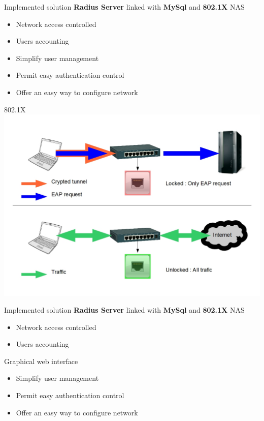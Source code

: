 \documentclass[12pt]{beamer}
\begin{document}
\begin{frame}{Implemented solution}
    \textbf{Radius Server} linked with \textbf{MySql} and \textbf{802.1X} NAS
    \begin{itemize}
	\item<1-2> Network access controlled
	\item<2> Users accounting
    \end{itemize}
    \vfill
    \begin{itemize}
	\item<0> Simplify user management
	\item<0> Permit easy authentication control
	\item<0> Offer an easy way to configure network
    \end{itemize}
    \vfill
\end{frame}
	
\begin{frame}{802.1X}
    \includegraphics[width=300pts]{img/dot1x.jpg}
\end{frame}

\begin{frame}{Implemented solution}
    \textbf{Radius Server} linked with \textbf{MySql} and \textbf{802.1X} NAS
    \begin{itemize}
	\item Network access controlled
	\item Users accounting
    \end{itemize}
    \vfill
    Graphical web interface
    \begin{itemize}
	\item<1-> Simplify user management
	\item<2-> Permit easy authentication control
	\item<3-> Offer an easy way to configure network
    \end{itemize}
    \vfill
\end{frame}
\end{document}
